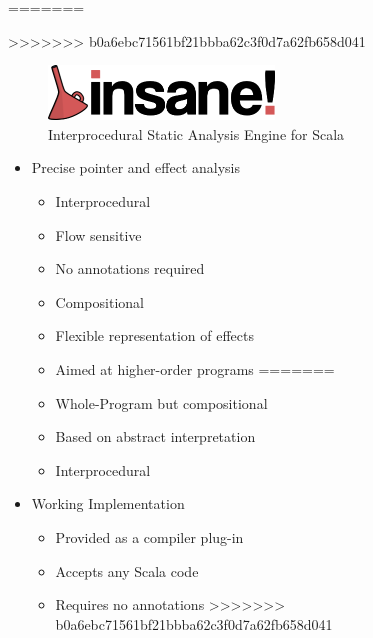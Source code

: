 \documentclass[hyperref={pdfpagelabels=false}]{beamer}
\begin{document}
\begin{frame}[label=overview]
=======

\begin{frame}[label=overview]
>>>>>>> b0a6ebc71561bf21bbba62c3f0d7a62fb658d041
    \begin{figure}[t]
        \includegraphics[width=60mm]{../../../logo.png}\\
        Interprocedural Static Analysis Engine for Scala
    \end{figure}

    \begin{itemize}
        \item Precise pointer and effect analysis
            \begin{itemize}
<<<<<<< HEAD
                \item Interprocedural
                \item Flow sensitive
                \item No annotations required
                \item Compositional
                \item Flexible representation of effects
                \item Aimed at higher-order programs
=======
                \item Whole-Program but compositional
                \item Based on abstract interpretation
                \item Interprocedural
            \end{itemize}
        \item Working Implementation
            \begin{itemize}
                \item Provided as a compiler plug-in
                \item Accepts any Scala code
                \item Requires no annotations
>>>>>>> b0a6ebc71561bf21bbba62c3f0d7a62fb658d041
            \end{itemize}
    \end{itemize}
\end{frame}


\end{frame}
\end{document}
